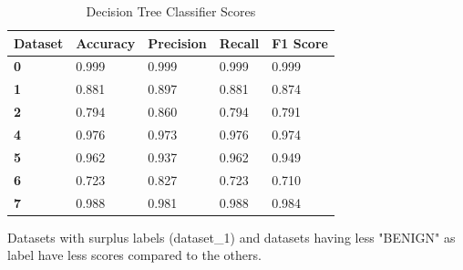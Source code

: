 \documentclass[submission,copyright,creativecommons]{eptcs}
\begin{document}
\begin{table}[h!]
\begin{center}
\begin{tabular}{|l|l|l|l|l|}
\hline
\textbf{Dataset}  & \textbf{Accuracy} & \textbf{Precision} & \textbf{Recall} & \textbf{F1 Score} \\ \hline
\textbf{0} & 0.999             & 0.999              & 0.999           & 0.999             \\ \hline
\textbf{1} & 0.881             & 0.897              & 0.881           & 0.874             \\ \hline
\textbf{2} & 0.794             & 0.860              & 0.794           & 0.791             \\ \hline
\textbf{4} & 0.976             & 0.973              & 0.976           & 0.974             \\ \hline
\textbf{5} & 0.962             & 0.937              & 0.962           & 0.949             \\ \hline
\textbf{6} & 0.723             & 0.827              & 0.723           & 0.710             \\ \hline
\textbf{7} & 0.988             & 0.981              & 0.988           & 0.984             \\ \hline
\end{tabular}
\caption{Decision Tree Classifier Scores}
\label{tab:my-table}
\end{center}
\end{table}
Datasets with surplus labels (dataset\_1) and datasets having less "BENIGN" as label have less scores compared to the others.
\end{document}
